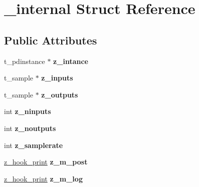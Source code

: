 \hypertarget{struct__internal}{\section{\-\_\-internal Struct Reference}
\label{struct__internal}
}
\subsection*{Public Attributes}
\begin{DoxyCompactItemize}
\item 
\hypertarget{struct__internal_a0cc965989ceab26ade2f0d7a718d55b7}{t\-\_\-pdinstance $\ast$ {\bfseries z\-\_\-intance}}\label{struct__internal_a0cc965989ceab26ade2f0d7a718d55b7}

\item 
\hypertarget{struct__internal_a805b11cfe1cb6f8ba52643280ff3100a}{t\-\_\-sample $\ast$ {\bfseries z\-\_\-inputs}}\label{struct__internal_a805b11cfe1cb6f8ba52643280ff3100a}

\item 
\hypertarget{struct__internal_aa85b37ba9e1bd25a2f0ea41fa82f7c20}{t\-\_\-sample $\ast$ {\bfseries z\-\_\-outputs}}\label{struct__internal_aa85b37ba9e1bd25a2f0ea41fa82f7c20}

\item 
\hypertarget{struct__internal_a6c4d9f7b72e84b79f46974b0ca743175}{int {\bfseries z\-\_\-ninputs}}\label{struct__internal_a6c4d9f7b72e84b79f46974b0ca743175}

\item 
\hypertarget{struct__internal_a09249e01b9b717c6378d99793f58d148}{int {\bfseries z\-\_\-noutputs}}\label{struct__internal_a09249e01b9b717c6378d99793f58d148}

\item 
\hypertarget{struct__internal_a841a409bba12cbb2c3407c4018b7a4df}{int {\bfseries z\-\_\-samplerate}}\label{struct__internal_a841a409bba12cbb2c3407c4018b7a4df}

\item 
\hypertarget{struct__internal_a4008ab9e5c14e0aa0a73de56f26bb88b}{\hyperlink{group__zpd_ga593812eca293daf504e9e6da49d00a52}{z\-\_\-hook\-\_\-print} {\bfseries z\-\_\-m\-\_\-post}}\label{struct__internal_a4008ab9e5c14e0aa0a73de56f26bb88b}

\item 
\hypertarget{struct__internal_a114208bfab17868cabc80610c9202fde}{\hyperlink{group__zpd_ga593812eca293daf504e9e6da49d00a52}{z\-\_\-hook\-\_\-print} {\bfseries z\-\_\-m\-\_\-log}}\label{struct__internal_a114208bfab17868cabc80610c9202fde}


\end{DoxyCompactItemize}
